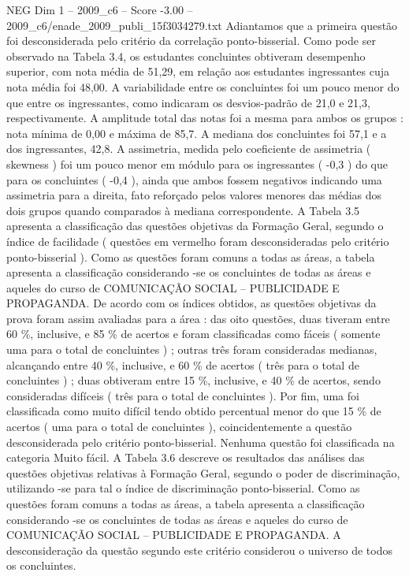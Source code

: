 \begin{textsample}{NEG Dim 1 – 2009\_c6 – Score -3.00 – 2009\_c6/enade\_2009\_publi\_15f3034279.txt}
Adiantamos que a primeira questão foi desconsiderada pelo critério da correlação ponto-bisserial.
Como pode ser observado na Tabela 3.4, os estudantes concluintes obtiveram desempenho superior, com nota média de 51,29, em relação aos estudantes ingressantes cuja nota média foi 48,00.
A variabilidade entre os concluintes foi um pouco menor do que entre os ingressantes, como indicaram os desvios-padrão de 21,0 e 21,3, respectivamente.
A amplitude total das notas foi a mesma para ambos os grupos : nota mínima de 0,00 e máxima de 85,7.
A mediana dos concluintes foi 57,1 e a dos ingressantes, 42,8.
A assimetria, medida pelo coeficiente de assimetria ( skewness ) foi um pouco menor em módulo para os ingressantes ( -0,3 ) do que para os concluintes ( -0,4 ), ainda que ambos fossem negativos indicando uma assimetria para a direita, fato reforçado pelos valores menores das médias dos dois grupos quando comparados à mediana correspondente.
A Tabela 3.5 apresenta a classificação das questões objetivas da Formação Geral, segundo o índice de facilidade ( questões em vermelho foram desconsideradas pelo critério ponto-bisserial ).
Como as questões foram comuns a todas as áreas, a tabela apresenta a classificação considerando -se os concluintes de todas as áreas e aqueles do curso de COMUNICAÇÃO SOCIAL – PUBLICIDADE E PROPAGANDA.
De acordo com os índices obtidos, as questões objetivas da prova foram assim avaliadas para a área : das oito questões, duas tiveram entre 60 \%, inclusive, e 85 \% de acertos e foram classificadas como fáceis ( somente uma para o total de concluintes ) ; outras três foram consideradas medianas, alcançando entre 40 \%, inclusive, e 60 \% de acertos ( três para o total de concluintes ) ; duas obtiveram entre 15 \%, inclusive, e 40 \% de acertos, sendo consideradas difíceis ( três para o total de concluintes ).
Por fim, uma foi classificada como muito difícil tendo obtido percentual menor do que 15 \% de acertos ( uma para o total de concluintes ), coincidentemente a questão desconsiderada pelo critério ponto-bisserial.
Nenhuma questão foi classificada na categoria Muito fácil.
A Tabela 3.6 descreve os resultados das análises das questões objetivas relativas à Formação Geral, segundo o poder de discriminação, utilizando -se para tal o índice de discriminação ponto-bisserial.
Como as questões foram comuns a todas as áreas, a tabela apresenta a classificação considerando -se os concluintes de todas as áreas e aqueles do curso de COMUNICAÇÃO SOCIAL – PUBLICIDADE E PROPAGANDA.
A desconsideração da questão segundo este critério considerou o universo de todos os concluintes.

\end{textsample}
